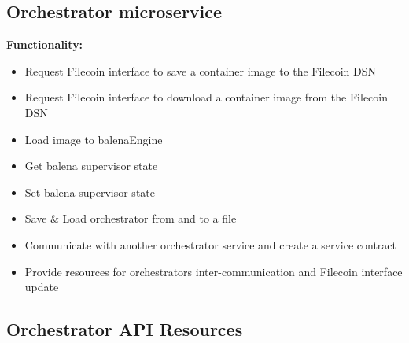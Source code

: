 \subsection{Orchestrator microservice}
\textbf{Functionality:}
\begin{itemize}
    \item Request Filecoin interface to save a container image to the Filecoin DSN
    \item Request Filecoin interface to download a container image from the Filecoin DSN
    \item Load image to balenaEngine
    \item Get balena supervisor state
    \item Set balena supervisor state 
    \item Save \& Load orchestrator from and to a file
    \item Communicate with another orchestrator service and create a service contract
    \item Provide resources for orchestrators inter-communication and Filecoin interface update
\end{itemize}

\subsection{Orchestrator API Resources}

